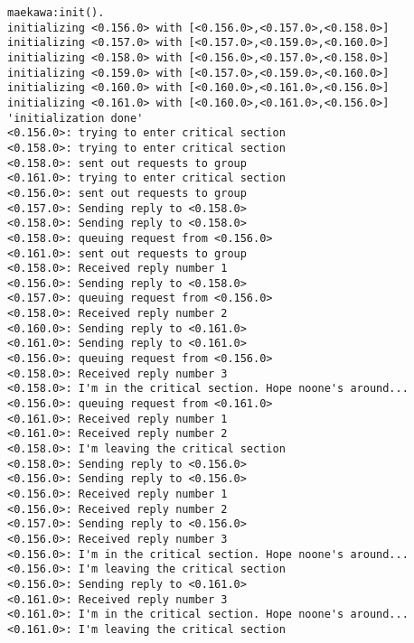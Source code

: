 \documentclass[a4paper,9pt]{article}
\begin{document}
\begin{verbatim}
maekawa:init().
initializing <0.156.0> with [<0.156.0>,<0.157.0>,<0.158.0>]
initializing <0.157.0> with [<0.157.0>,<0.159.0>,<0.160.0>]
initializing <0.158.0> with [<0.156.0>,<0.157.0>,<0.158.0>]
initializing <0.159.0> with [<0.157.0>,<0.159.0>,<0.160.0>]
initializing <0.160.0> with [<0.160.0>,<0.161.0>,<0.156.0>]
initializing <0.161.0> with [<0.160.0>,<0.161.0>,<0.156.0>]
'initialization done'
<0.156.0>: trying to enter critical section
<0.158.0>: trying to enter critical section
<0.158.0>: sent out requests to group 
<0.161.0>: trying to enter critical section
<0.156.0>: sent out requests to group 
<0.157.0>: Sending reply to <0.158.0>
<0.158.0>: Sending reply to <0.158.0>
<0.158.0>: queuing request from <0.156.0>
<0.161.0>: sent out requests to group 
<0.158.0>: Received reply number 1
<0.156.0>: Sending reply to <0.158.0>
<0.157.0>: queuing request from <0.156.0>
<0.158.0>: Received reply number 2
<0.160.0>: Sending reply to <0.161.0>
<0.161.0>: Sending reply to <0.161.0>
<0.156.0>: queuing request from <0.156.0>
<0.158.0>: Received reply number 3
<0.158.0>: I'm in the critical section. Hope noone's around...
<0.156.0>: queuing request from <0.161.0>
<0.161.0>: Received reply number 1
<0.161.0>: Received reply number 2
<0.158.0>: I'm leaving the critical section
<0.158.0>: Sending reply to <0.156.0>
<0.156.0>: Sending reply to <0.156.0>
<0.156.0>: Received reply number 1
<0.156.0>: Received reply number 2
<0.157.0>: Sending reply to <0.156.0>
<0.156.0>: Received reply number 3
<0.156.0>: I'm in the critical section. Hope noone's around...
<0.156.0>: I'm leaving the critical section
<0.156.0>: Sending reply to <0.161.0>
<0.161.0>: Received reply number 3
<0.161.0>: I'm in the critical section. Hope noone's around...
<0.161.0>: I'm leaving the critical section

\end{verbatim}
\end{document}
